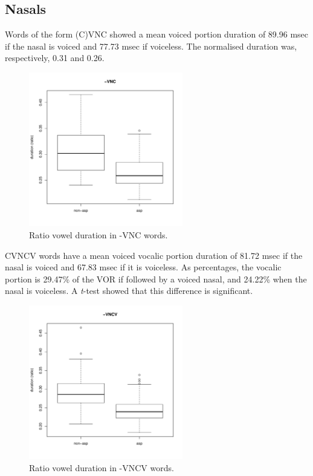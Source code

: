 \documentclass[11pt,a4paper,openany]{memoir}\usepackage[]{graphicx}\usepackage[]{color}
\newenvironment{knitrout}{}{} %
\begin{document}
\subsection{Nasals}


Words of the form (C)VNC showed a mean voiced portion duration of 89.96 msec if the nasal is voiced and 77.73 msec if voiceless.
The normalised duration was, respectively, 0.31 and 0.26.

\begin{figure}
\centering
\begin{knitrout}
\color{fgcolor}
\includegraphics[width=0.6\textwidth]{img/mono-nas-box-1} 

\end{knitrout}
\caption{Ratio vowel duration in -VNC words.}
\label{f:mononas}
\end{figure}



CVNCV words have a mean voiced vocalic portion duration of 81.72 msec if the nasal is voiced and 67.83 msec if it is voiceless.
As percentages, the vocalic portion is 29.47\% of the VOR if followed by a voiced nasal, and 24.22\% when the nasal is voiceless.
A \textit{t}-test showed that this difference is significant.

\begin{figure}
\centering
\begin{knitrout}
\color{fgcolor}
\includegraphics[width=0.6\textwidth]{img/di-nas-box-1} 

\end{knitrout}
\caption{Ratio vowel duration in -VNCV words.}
\label{f:dinas}
\end{figure}
\end{document}
